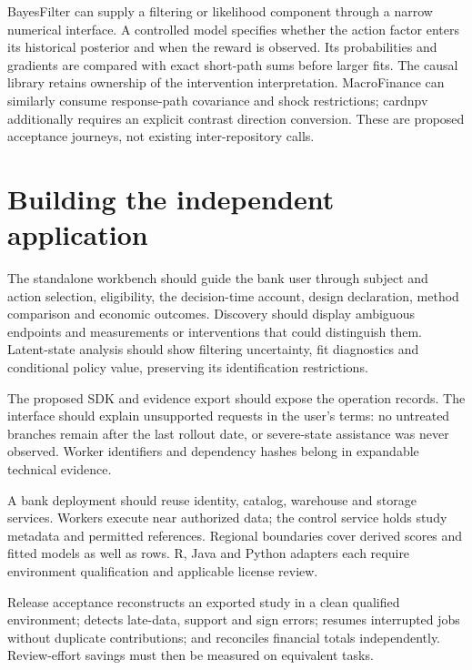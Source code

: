 BayesFilter can supply a filtering or likelihood component through a narrow
numerical interface. A controlled model specifies whether the action factor
enters its historical posterior and when the reward is observed. Its
probabilities and gradients are compared with exact short-path sums before
larger fits. The causal library retains ownership of the intervention
interpretation. MacroFinance can similarly consume response-path covariance
and shock restrictions; cardnpv additionally requires an explicit contrast
direction conversion. These are proposed acceptance journeys, not existing
inter-repository calls.

\section{Building the independent application}
The standalone workbench should guide the bank user through subject and
action selection, eligibility, the decision-time account, design declaration,
method comparison and economic outcomes. Discovery should display ambiguous
endpoints and measurements or interventions that could distinguish them.
Latent-state analysis should show filtering uncertainty, fit diagnostics
and conditional policy value, preserving its identification restrictions.

The proposed SDK and evidence export should expose the operation records.
The interface should explain unsupported requests in the user's terms:
no untreated branches remain after the last rollout date, or severe-state
assistance was never observed. Worker identifiers and dependency hashes
belong in expandable technical evidence.

A bank deployment should reuse identity, catalog, warehouse and storage
services. Workers execute near authorized data; the control service holds
study metadata and permitted references. Regional boundaries cover derived
scores and fitted models as well as rows. R, Java and Python adapters each
require environment qualification and applicable license review.

Release acceptance reconstructs an exported study in a clean qualified
environment; detects late-data, support and sign errors; resumes interrupted
jobs without duplicate contributions; and reconciles financial totals
independently. Review-effort savings must then be measured on equivalent tasks.
